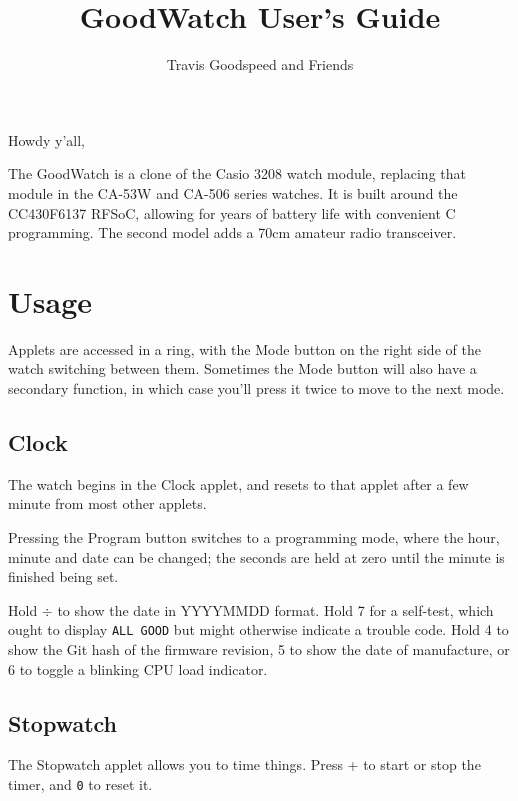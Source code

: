 \documentclass{article}
\begin{document}


\title{GoodWatch User's Guide}
\author{Travis Goodspeed and Friends}
\maketitle


\begin{multicols}{2}
\noindent
Howdy y'all,

The GoodWatch is a clone of the Casio 3208 watch module, replacing
that module in the CA-53W and CA-506 series watches.  It is built
around the CC430F6137 RFSoC, allowing for years of battery life with
convenient C programming.  The second model adds a 70cm amateur radio
transceiver.

\section{Usage}

Applets are accessed in a ring, with the Mode button on the right side
of the watch switching between them.  Sometimes the Mode button will
also have a secondary function, in which case you'll press it twice to
move to the next mode.

\subsection*{Clock}

The watch begins in the Clock applet, and resets to that applet after
a few minute from most other applets.

Pressing the Program button switches to a programming mode, where the
hour, minute and date can be changed; the seconds are held at zero
until the minute is finished being set.

Hold $\div$ to show the date in YYYYMMDD format.  Hold 7 for a
self-test, which ought to display {\tt ALL GOOD} but might otherwise
indicate a trouble code.  Hold 4 to show the Git hash of the firmware
revision, 5 to show the date of manufacture, or 6 to toggle a blinking
CPU load indicator.

\subsection*{Stopwatch}

The Stopwatch applet allows you to time things.  Press + to start or
stop the timer, and {\tt 0} to reset it.


\end{multicols}
\end{document}
